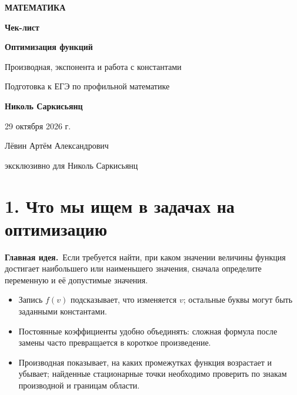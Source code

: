 \documentclass[a4paper,12pt]{article}
\newcommand{\idea}[1]{\par\noindent\textcolor{accentdark}{\textbf{Главная идея.}}\ #1\par}
\begin{document}
\thispagestyle{empty}
\begin{center}
\vspace*{19mm}
{\small\bfseries\textcolor{accent}{МАТЕМАТИКА}}\par
\vspace{27mm}
{\fontsize{34}{39}\selectfont\bfseries Чек-лист}\par
\vspace{12mm}
{\LARGE\bfseries Оптимизация функций}\par
\vspace{4mm}
{\Large Производная, экспонента и работа с константами}\par
\vspace{20mm}
{\normalsize Подготовка к ЕГЭ по профильной математике}\par
\vspace{21mm}
{\Large\bfseries Николь Саркисьянц}\par
\vspace{7mm}
29 октября 2026 г.\par
\vfill
{\small Лёвин Артём Александрович}\par
{\small эксклюзивно для Николь Саркисьянц}\par
\vspace{12mm}
\end{center}
\clearpage

\section*{1. Что мы ищем в задачах на оптимизацию}
\idea{Если требуется найти, при каком значении величины функция достигает наибольшего или наименьшего значения, сначала определите переменную и её допустимые значения.}

\begin{itemize}
\item Запись $f(v)$ подсказывает, что изменяется $v$; остальные буквы могут быть заданными константами.
\item Постоянные коэффициенты удобно объединять: сложная формула после замены часто превращается в короткое произведение.
\item Производная показывает, на каких промежутках функция возрастает и убывает; найденные стационарные точки необходимо проверить по знакам производной и границам области.
\end{itemize}
\end{document}
